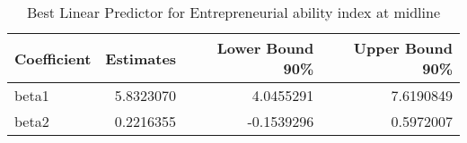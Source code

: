 \begin{table}

\caption{\label{tab:blpREntrep_total}Best Linear Predictor for Entrepreneurial ability index at midline}
\centering
\begin{tabular}[t]{lrrr}
\toprule
Coefficient & Estimates & Lower Bound 90\% & Upper Bound 90\%\\
\midrule
beta1 & 5.8323070 & 4.0455291 & 7.6190849\\
beta2 & 0.2216355 & -0.1539296 & 0.5972007\\
\bottomrule
\end{tabular}
\end{table}
